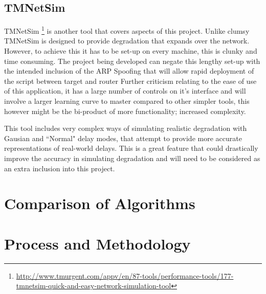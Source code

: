 \subsection{TMNetSim}
TMNetSim \footnote{\url{http://www.tmurgent.com/appv/en/87-tools/performance-tools/177-tmnetsim-quick-and-easy-network-simulation-tool}} is another tool that covers aspects of this project. Unlike clumsy TMNetSim is designed to provide degradation that expands over the network. However, to achieve this it has to be set-up on every machine, this is clunky and time consuming. The project being developed can negate this lengthy set-up with the intended inclusion of the ARP Spoofing that will allow rapid deployment of the script between target and router  Further criticism relating to the ease of use of this application, it has a large number of controls on it's interface and will involve a larger learning curve to master compared to other simpler tools, this however might be the bi-product of more functionality; increased complexity.

This tool includes very complex ways of simulating realistic degradation with Gausian and ``Normal" delay modes, that attempt to provide more accurate representations of real-world delays. This is a great feature that could drastically improve the accuracy in simulating degradation and will need to be considered as an extra inclusion into this project.

\section{Comparison of Algorithms}



\section{Process and Methodology}
